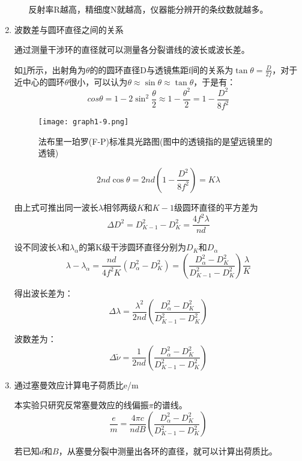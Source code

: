 \documentclass[dvipsnames, svgnames,a4paper,11pt]{article}
\begin{document}
\begin{enumerate}
\begin{itemize}
						反射率R越高，精细度N就越高，仪器能分辨开的条纹数就越多。

					\end{itemize}

			\item 波数差与圆环直径之间的关系
			
				通过测量干涉环的直径就可以测量各分裂谱线的波长或波长差。

				如\cref{fig:graph1-9}所示，出射角为$\theta$的的圆环直径D与透镜焦距f间的关系为$\tan{\theta}=\frac{D}{2f}$，对于近中心的圆环$\theta$很小，可以认为$\theta\approx\sin{\theta}\approx\tan{\theta}$，于是有：
				\[
					cos\theta = 1 - 2 \sin^2\frac{\theta}{2} \approx 1 - \frac{\theta^2}{2} = 1 - \frac{D^2}{8f^2}	
				\]

				\begin{figure}[H]
					\centering
					\texttt{[image: graph1-9.png]}
					\caption{法布里一珀罗(F-P)标准具光路图(图中的透镜指的是望远镜里的透镜)}
					\label{fig:graph1-9}
				\end{figure}

				\[
					2 n d \cos \theta = 2 n d (1 - \frac{D^2}{8f^2}) = K \lambda	
				\]

				由上式可推出同一波长$\lambda$相邻两级$K$和$K - 1$级圆环直径的平方差为
				\[
					\Delta D^2 = D^2_{K-1} - D^2_{K} = \frac{4 f^2 \lambda}{n d}	
				\]

				设不同波长$\lambda$和$\lambda_{\alpha}$的第K级干涉圆环直径分别为$D_K$和$D_{\alpha}$
				\[
					\lambda - \lambda_\alpha = \frac{nd}{4 f^2 K}(D^2_\alpha - D^2_K) = (\frac{D^2_\alpha - D^2_K}{D^2_{K-1} - D^2_{K}})\frac{\lambda}{K}	
				\]

				得出波长差为：
				\[
					\Delta \lambda = \frac{\lambda^2}{2 n d}(\frac{D^2_\alpha - D^2_K}{D^2_{K-1} - D^2_{K}})
				\]
				
				波数差为：
				\[
					\Delta \tilde{\nu} = \frac{1}{2 n d}(\frac{D^2_\alpha - D^2_K}{D^2_{K-1} - D^2_{K}})
				\]

			\item 通过塞曼效应计算电子荷质比e/m
			
				本实验只研究反常塞曼效应的线偏振$\pi$的谱线。
				\[
					\frac{e}{m} = \frac{4\pi c}{n d B}(\frac{D^2_\alpha - D^2_K}{D^2_{K-1} - D^2_{K}})
				\]
				
				若已知$d$和$B$，从塞曼分裂中测量出各环的直径，就可以计算出荷质比。
		\end{enumerate}

   

        
\end{document}
